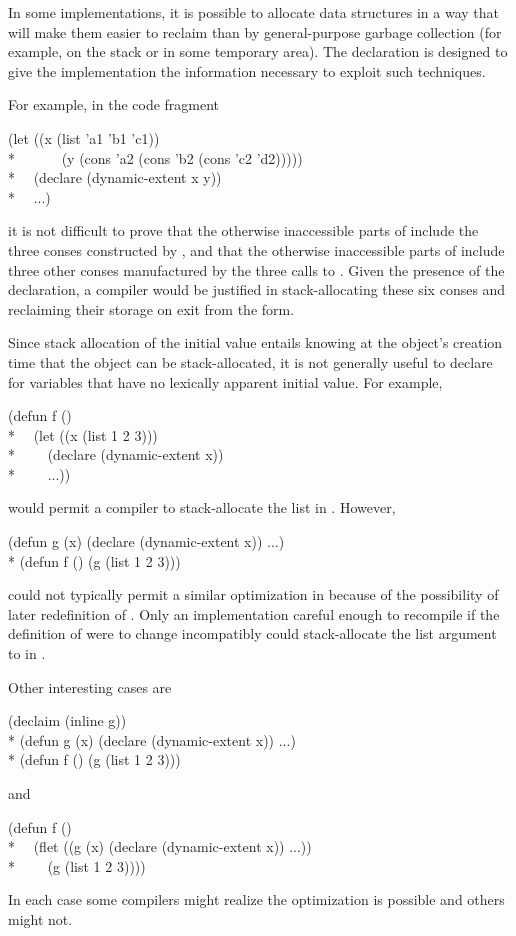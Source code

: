 \begin{flushdesc}
  In some implementations, it is possible to allocate data structures in a way
that will make them easier to reclaim than by general-purpose garbage collection
(for example, on the stack or in some temporary area).  The 
declaration is designed to give the implementation the information necessary to
exploit such techniques.

For example, in the code fragment
\begin{lisp} (let ((x (list 'a1 'b1 'c1)) \\* ~~~~~~(y (cons 'a2 (cons 'b2 (cons
'c2 'd2))))) \\* ~~(declare (dynamic-extent x y)) \\* ~~...)
\end{lisp} it is not difficult to prove that the otherwise inaccessible parts of
 include the three conses constructed by , and that the
otherwise inaccessible parts of  include three other conses manufactured
by the three calls to .  Given the presence of the
 declaration, a compiler would be justified in
stack-allocating these six conses and reclaiming their storage on exit from the
 form.

  Since stack allocation of the initial value entails knowing at the object's
creation time that the object can be stack-allocated, it is not generally useful
to declare  for variables that have no lexically apparent
initial value. For example,
\begin{lisp} (defun f () \\* ~~(let ((x (list 1 2 3))) \\* ~~~~(declare
(dynamic-extent x)) \\* ~~~~...))
\end{lisp} would permit a compiler to stack-allocate the list in
. However,
\begin{lisp} (defun g (x) (declare (dynamic-extent x)) ...) \\* (defun f () (g
(list 1 2 3)))
\end{lisp} could not typically permit a similar optimization in  because
of the possibility of later redefinition of .  Only an implementation
careful enough to recompile  if the definition of  were to change
incompatibly could stack-allocate the list argument to  in .

  Other interesting cases are
\begin{lisp} (declaim (inline g)) \\* (defun g (x) (declare (dynamic-extent x))
...) \\* (defun f () (g (list 1 2 3)))
\end{lisp} and
\begin{lisp} (defun f () \\* ~~(flet ((g (x) (declare (dynamic-extent x)) ...))
\\* ~~~~(g (list 1 2 3))))
\end{lisp} In each case some compilers might realize the optimization is
possible and others might not.


\end{flushdesc}
